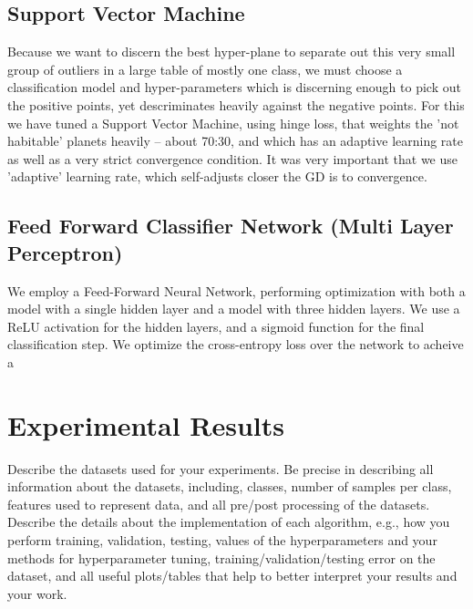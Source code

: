 \documentclass[11.5pt]{article}
\begin{document}
\subsection{Support Vector Machine}
Because we want to discern the best hyper-plane to separate out this very small group of outliers in a large table of mostly one class, we must choose a classification model and hyper-parameters which is discerning enough to pick out the positive points, yet descriminates heavily against the negative points. For this we have tuned a Support Vector Machine, using hinge loss, that weights the 'not habitable' planets heavily -- about 70:30, and which has an adaptive learning rate as well as a very strict convergence condition.  It was very important that we use 'adaptive' learning rate, which self-adjusts closer the GD is to convergence. 


\subsection{Feed Forward Classifier Network (Multi Layer Perceptron)}
We employ a Feed-Forward Neural Network, performing optimization with both a model with a single hidden layer and a model with three hidden layers. We use a ReLU activation for the hidden layers, and a sigmoid function for the final classification step. We optimize the cross-entropy loss over the network to acheive a 

\section{Experimental Results}
Describe the datasets used for your experiments. Be precise in describing all information about the datasets, including, classes, number of samples per class, features used to represent data, and all pre/post processing of the datasets.\\
Describe the details about the implementation of each algorithm, e.g., how you perform training, validation, testing, values of the hyperparameters and your methods for hyperparameter tuning, training/validation/testing error on the dataset, and all useful plots/tables that help to better interpret your results and your work.
\end{document}
